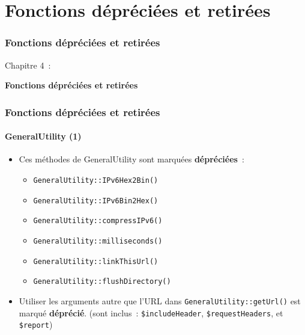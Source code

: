%

\section{Fonctions dépréciées et retirées}
\begin{frame}[fragile]
	\frametitle{Fonctions dépréciées et retirées}

	\begin{center}\huge{Chapitre 4~:}\end{center}
	\begin{center}\huge{\color{typo3darkgrey}\textbf{Fonctions dépréciées et retirées}}\end{center}

\end{frame}


\begin{frame}[fragile]
	\frametitle{Fonctions dépréciées et retirées}
	\framesubtitle{GeneralUtility (1)}

	\begin{itemize}
		\item Ces méthodes de GeneralUtility sont marquées \textbf{dépréciées}~:
			\begin{itemize}\smaller
				\item \texttt{GeneralUtility::IPv6Hex2Bin()}
				\item \texttt{GeneralUtility::IPv6Bin2Hex()}
				\item \texttt{GeneralUtility::compressIPv6()}
				\item \texttt{GeneralUtility::milliseconds()}
				\item \texttt{GeneralUtility::linkThisUrl()}
				\item \texttt{GeneralUtility::flushDirectory()}
			\end{itemize}\normalsize
			\vspace{0.4cm}

		\item Utiliser les arguments autre que l'URL dans \texttt{GeneralUtility::getUrl()}
			est marqué \textbf{déprécié}.\newline
			\smaller
				(sont inclus~: \texttt{\$includeHeader}, \texttt{\$requestHeaders}, et \texttt{\$report})
			\normalsize

	\end{itemize}

\end{frame}

